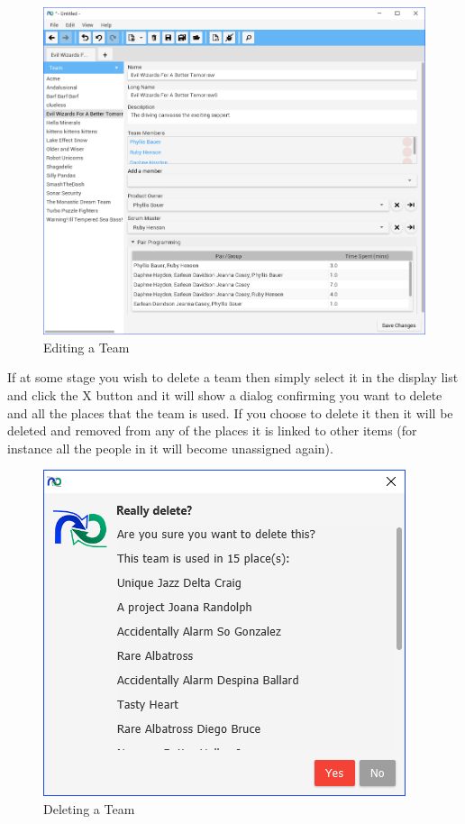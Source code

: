 \begin{figure}[H]
\centering
\includegraphics[width=\textwidth]{images/screenshots/teams4.PNG}
\caption{Editing a Team}
\label{fig:new_project}
\end{figure}

If at some stage you wish to delete a team then simply select it in the display list and click the X button and it will show a dialog confirming you want to delete and all the places that the team is used. If you choose to delete it then it will be deleted and removed from any of the places it is linked to other items (for instance all the people in it will become unassigned again).

\begin{figure}[H]
\centering
\includegraphics[width=\textwidth]{images/screenshots/teams5.PNG}
\caption{Deleting a Team}
\label{fig:new_project}
\end{figure}

